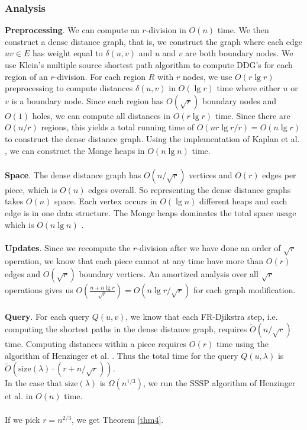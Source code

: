 \subsubsection{Analysis}
\textbf{Preprocessing}.
We can compute an $r$-division in $O(n)$
time. We then
construct a dense distance graph, that is, we construct the graph where each edge $uv\in
E$ has weight equal to $\delta(u,v)$ and $u$ and $v$ are both boundary nodes. We use
Klein's multiple source shortest path algorithm \cite{klein2005multiple} to compute DDG's
for each region of an $r$-division. For each region $R$ with $r$ nodes, we use $O(r\lg
r)$ preprocessing to compute distances $\delta(u,v)$ in $O(\lg r)$ time where either $u$
or $v$ is a boundary node. Since each region has $O(\sqrt{r})$ boundary nodes and $O(1)$
holes, we can compute all distances in $O(r\lg r)$ time. Since there are $O(n/r)$
regions, this yields a total running time of $O(nr\lg r/r)=O(n\lg r)$ to construct the
dense distance graph. Using the implementation of Kaplan et al.
\cite{kaplan2012submatrix}, we can construct the Monge heaps in $O(n\lg n)$ time.\\
\\
\textbf{Space}. The dense distance graph has $O(n/\sqrt{r})$ vertices and $O(r)$ edges
per piece, which is $O(n)$ edges overall. So representing the dense distance graphs takes
$O(n)$ space. Each vertex occurs in $O(\lg n)$ different heaps and each edge is in one
data structure. The Monge heaps dominates the total space usage which is $O(n\lg n)$
\cite{kaplan2012submatrix}. \\
\\
\textbf{Updates}.
 Since we recompute the $r$-division after we have
done an order of $\sqrt{r}$ operation, we know that each piece cannot at any time have
more than $O(r)$ edges and $O(\sqrt{r})$ boundary vertices. An amortized analysis over
all $\sqrt{r}$ operations gives us $O(\frac{n+n\lg r}{\sqrt{r}})=O(n\lg r/\sqrt{r})$ for
each graph modification. \\
\\
\textbf{Query}. For each query $Q(u,v)$, we know that each FR-Djikstra step, i.e. computing
the shortest paths in the dense distance graph, requires $\tilde{O}(n/\sqrt{r})$ time.
Computing distances within a piece requires $O(r)$ time using the algorithm of Henzinger
et al. \cite{henzinger1997faster}. Thus the total time for the query $Q(u,\lambda)$ is
$\tilde{O}(\text{size}(\lambda)\cdot (r+n/\sqrt{r}))$. \\
In the case that $\text{size}(\lambda)$ is $\Omega(n^{1/3})$, we run the SSSP algorithm
of Henzinger et al. in $O(n)$ time. \\
\\
If we pick $r=n^{2/3}$, we get Theorem \ref{thm4}.

